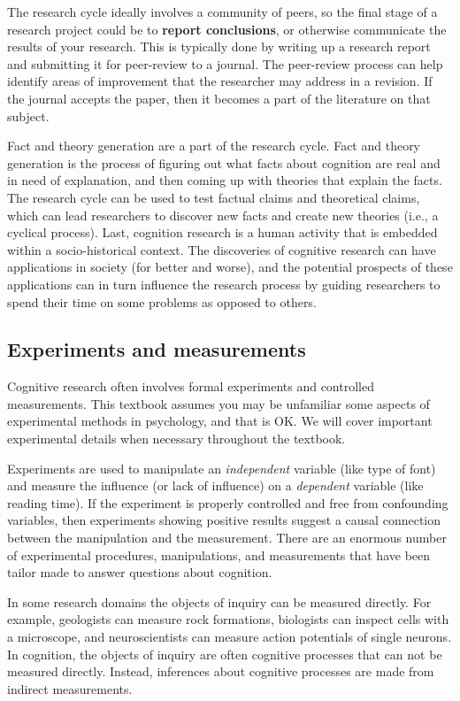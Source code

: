 \documentclass[
  oneside,
  12pt]{crumpbook}
\begin{document}
The research cycle ideally involves a community of peers, so the final stage of a research project could be to \textbf{report conclusions}, or otherwise communicate the results of your research. This is typically done by writing up a research report and submitting it for peer-review to a journal. The peer-review process can help identify areas of improvement that the researcher may address in a revision. If the journal accepts the paper, then it becomes a part of the literature on that subject.

Fact and theory generation are a part of the research cycle. Fact and theory generation is the process of figuring out what facts about cognition are real and in need of explanation, and then coming up with theories that explain the facts. The research cycle can be used to test factual claims and theoretical claims, which can lead researchers to discover new facts and create new theories (i.e., a cyclical process). Last, cognition research is a human activity that is embedded within a socio-historical context. The discoveries of cognitive research can have applications in society (for better and worse), and the potential prospects of these applications can in turn influence the research process by guiding researchers to spend their time on some problems as opposed to others.

\hypertarget{experiments-and-measurements}{%
\subsection{Experiments and measurements}\label{experiments-and-measurements}}

Cognitive research often involves formal experiments and controlled measurements. This textbook assumes you may be unfamiliar some aspects of experimental methods in psychology, and that is OK. We will cover important experimental details when necessary throughout the textbook.

Experiments are used to manipulate an \emph{independent} variable (like type of font) and measure the influence (or lack of influence) on a \emph{dependent} variable (like reading time). If the experiment is properly controlled and free from confounding variables, then experiments showing positive results suggest a causal connection between the manipulation and the measurement. There are an enormous number of experimental procedures, manipulations, and measurements that have been tailor made to answer questions about cognition.

In some research domains the objects of inquiry can be measured directly. For example, geologists can measure rock formations, biologists can inspect cells with a microscope, and neuroscientists can measure action potentials of single neurons. In cognition, the objects of inquiry are often cognitive processes that can not be measured directly. Instead, inferences about cognitive processes are made from indirect measurements.
\end{document}
